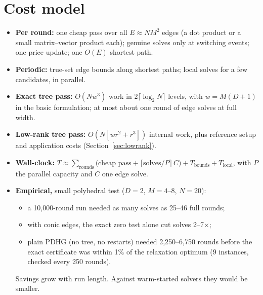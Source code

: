 \documentclass[11pt]{article}
\theoremstyle{plain}
\theoremstyle{definition}
\theoremstyle{remark}
\begin{document}
\section{Cost model}
\begin{itemize}[leftmargin=1.2em]
  \item \textbf{Per round:} one cheap pass over all $E\approx NM^2$ edges (a dot product or a small matrix--vector product each); genuine solves only at switching events; one price update; one $O(E)$ shortest path.
  \item \textbf{Periodic:} true-set edge bounds along shortest paths; local solves for a few candidates, in parallel.
  \item \textbf{Exact tree pass:} $O(Nw^3)$ work in $2\lceil\log_2N\rceil$ levels, with $w=M(D+1)$ in the basic formulation; at most about one round of edge solves at full width.
  \item \textbf{Low-rank tree pass:} $O(N[wr^2+r^3])$ internal work, plus reference setup and application costs (Section~\ref{sec:lowrank}).
  \item \textbf{Wall-clock:} $T\approx\sum_{\text{rounds}}\big(\text{cheap pass}+\lceil\text{solves}/P\rceil\,C\big)+T_{\text{bounds}}+T_{\text{local}}$, with $P$ the parallel capacity and $C$ one edge solve.
  \item \textbf{Empirical,} small polyhedral test ($D=2$, $M=4$--$8$, $N=20$):
  \begin{itemize}[leftmargin=1.2em]
    \item a 10{,}000-round run needed as many solves as 25--46 full rounds;
    \item with conic edges, the exact zero test alone cut solves 2--7$\times$;
    \item plain PDHG (no tree, no restarts) needed 2{,}250--6{,}750 rounds before the exact certificate was within 1\% of the relaxation optimum (9 instances, checked every 250 rounds).
  \end{itemize}
  Savings grow with run length. Against warm-started solvers they would be smaller.
\end{itemize}

\end{document}
